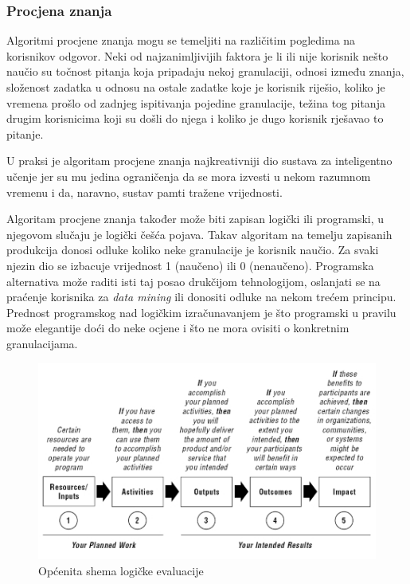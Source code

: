 \documentclass[times, utf8, zavrsni]{fer}
\begin{document}
\subsubsection{Procjena znanja}
Algoritmi procjene znanja mogu se temeljiti na različitim pogledima na korisnikov odgovor. Neki od najzanimljivijih faktora je li ili nije korisnik nešto naučio su točnost pitanja koja pripadaju nekoj granulaciji, odnosi između znanja, složenost zadatka u odnosu na ostale zadatke koje je korisnik riješio, koliko je vremena prošlo od zadnjeg ispitivanja pojedine granulacije, težina tog pitanja drugim korisnicima koji su došli do njega i koliko je dugo korisnik rješavao to pitanje.
\par
U praksi je algoritam procjene znanja najkreativniji dio sustava za inteligentno učenje jer su mu jedina ograničenja da se mora izvesti u nekom razumnom vremenu i da, naravno, sustav pamti tražene vrijednosti.
\par
Algoritam procjene znanja također može biti zapisan logički ili programski, u njegovom slučaju je logički češća pojava. Takav algoritam na temelju zapisanih produkcija donosi odluke koliko neke granulacije je korisnik naučio. Za svaki njezin dio se izbacuje vrijednost 1 (naučeno) ili 0 (nenaučeno). Programska alternativa može raditi isti taj posao drukčijom tehnologijom, oslanjati se na praćenje korisnika za \textit{data mining} ili donositi odluke na nekom trećem principu. Prednost programskog nad logičkim izračunavanjem je što programski u pravilu može elegantije doći do neke ocjene i što ne mora ovisiti o konkretnim granulacijama.

\begin{figure}[htb]
	\centering
	\includegraphics[]{img/logic.jpg}
	\caption{Općenita shema logičke evaluacije}
	\label{fig:logic_eval}
\end{figure}
\end{document}
